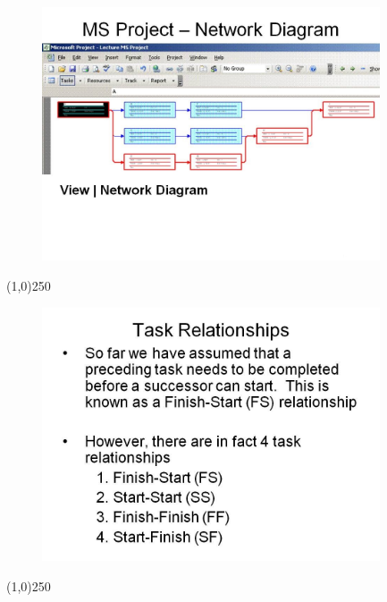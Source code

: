 \begin{frame}
\begin{figure}
	\centering
		\includegraphics[width = 10.0cm]{oldnotes/Slide174.jpg}
\end{figure}
\end{frame}
\begin{center}\line(1,0){250}\end{center}




\begin{frame}
\begin{figure}
	\centering
		\includegraphics[width = 10.0cm]{oldnotes/Slide175.jpg}
\end{figure}
\end{frame}
\begin{center}\line(1,0){250}\end{center}




